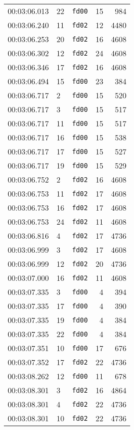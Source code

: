 \documentclass{article}
\begin{document}
\begin{longtable}{lllrr}
00:03:06.013 & 22 & \texttt{fd00} & 15 & 984 \\
00:03:06.240 & 11 & \texttt{fd02} & 12 & 4480 \\
00:03:06.253 & 20 & \texttt{fd02} & 16 & 4608 \\
00:03:06.302 & 12 & \texttt{fd02} & 24 & 4608 \\
00:03:06.346 & 17 & \texttt{fd02} & 16 & 4608 \\
00:03:06.494 & 15 & \texttt{fd00} & 23 & 384 \\
00:03:06.717 & 2 & \texttt{fd00} & 15 & 520 \\
00:03:06.717 & 3 & \texttt{fd00} & 15 & 517 \\
00:03:06.717 & 11 & \texttt{fd00} & 15 & 517 \\
00:03:06.717 & 16 & \texttt{fd00} & 15 & 538 \\
00:03:06.717 & 17 & \texttt{fd00} & 15 & 527 \\
00:03:06.717 & 19 & \texttt{fd00} & 15 & 529 \\
00:03:06.752 & 2 & \texttt{fd02} & 16 & 4608 \\
00:03:06.753 & 11 & \texttt{fd02} & 17 & 4608 \\
00:03:06.753 & 16 & \texttt{fd02} & 17 & 4608 \\
00:03:06.753 & 24 & \texttt{fd02} & 11 & 4608 \\
00:03:06.816 & 4 & \texttt{fd02} & 17 & 4736 \\
00:03:06.999 & 3 & \texttt{fd02} & 17 & 4608 \\
00:03:06.999 & 12 & \texttt{fd02} & 20 & 4736 \\
00:03:07.000 & 16 & \texttt{fd02} & 11 & 4608 \\
00:03:07.335 & 3 & \texttt{fd00} & 4 & 394 \\
00:03:07.335 & 17 & \texttt{fd00} & 4 & 390 \\
00:03:07.335 & 19 & \texttt{fd00} & 4 & 384 \\
00:03:07.335 & 22 & \texttt{fd00} & 4 & 384 \\
00:03:07.351 & 10 & \texttt{fd00} & 17 & 676 \\
00:03:07.352 & 17 & \texttt{fd02} & 22 & 4736 \\
00:03:08.262 & 12 & \texttt{fd00} & 11 & 678 \\
00:03:08.301 & 3 & \texttt{fd02} & 16 & 4864 \\
00:03:08.301 & 4 & \texttt{fd02} & 22 & 4736 \\
00:03:08.301 & 10 & \texttt{fd02} & 22 & 4736 \\

\end{longtable}
\end{document}
